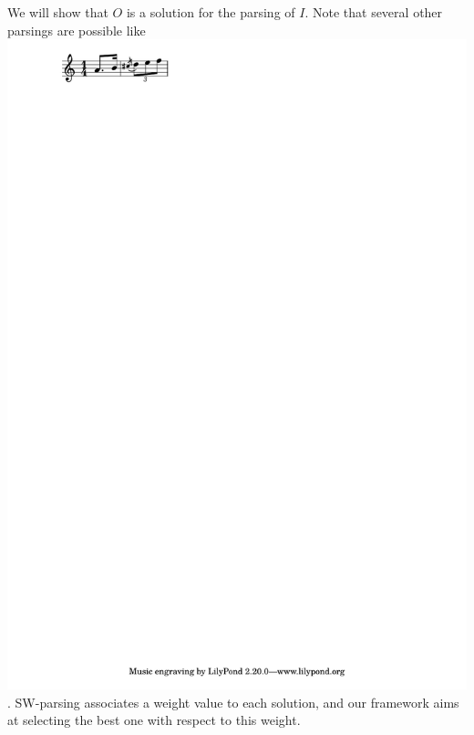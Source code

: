 \begin{example}
We will show that $O$ is a solution for the
parsing of $I$. Note that several other parsings are possible
like \eg \includegraphics[scale=0.35,trim=0 5mm 0 0]{pictures/ex2.pdf}.
SW-parsing associates a weight value
to each solution, and our framework
aims at selecting the best one with respect to this weight.
\endex
\end{example}
